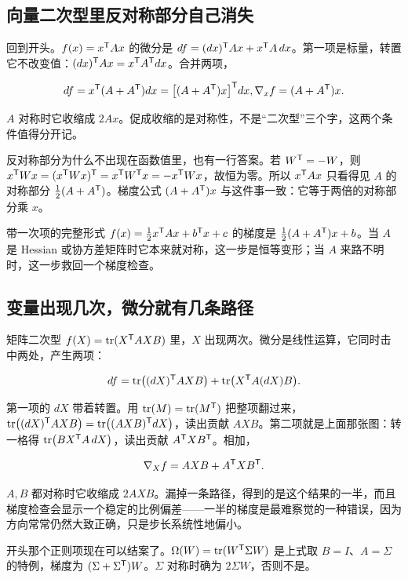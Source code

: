 \subsection{向量二次型里反对称部分自己消失}

回到开头。\(f(x)=x^{\mathsf{T}}Ax\) 的微分是 \(df=(dx)^{\mathsf{T}}Ax+x^{\mathsf{T}}A\,dx\)。第一项是标量，转置它不改变值：\((dx)^{\mathsf{T}}Ax=x^{\mathsf{T}}A^{\mathsf{T}}dx\)。合并两项，

\[
df=x^{\mathsf{T}}(A+A^{\mathsf{T}})dx
=\bigl[(A+A^{\mathsf{T}})x\bigr]^{\mathsf{T}}dx,
\space
\nabla_x f=(A+A^{\mathsf{T}})x.
\]

\(A\) 对称时它收缩成 \(2Ax\)。促成收缩的是对称性，不是``二次型''三个字，这两个条件值得分开记。

反对称部分为什么不出现在函数值里，也有一行答案。若 \(W^{\mathsf{T}}=-W\)，则 \(x^{\mathsf{T}}Wx=(x^{\mathsf{T}}Wx)^{\mathsf{T}}=x^{\mathsf{T}}W^{\mathsf{T}}x=-x^{\mathsf{T}}Wx\)，故恒为零。所以 \(x^{\mathsf{T}}Ax\) 只看得见 \(A\) 的对称部分 \(\tfrac12(A+A^{\mathsf{T}})\)。梯度公式 \((A+A^{\mathsf{T}})x\) 与这件事一致：它等于两倍的对称部分乘 \(x\)。

带一次项的完整形式 \(f(x)=\tfrac12x^{\mathsf{T}}Ax+b^{\mathsf{T}}x+c\) 的梯度是 \(\tfrac12(A+A^{\mathsf{T}})x+b\)。当 \(A\) 是 Hessian 或协方差矩阵时它本来就对称，这一步是恒等变形；当 \(A\) 来路不明时，这一步救回一个梯度检查。

\subsection{变量出现几次，微分就有几条路径}

矩阵二次型 \(f(X)=\operatorname{tr}(X^{\mathsf{T}}AXB)\) 里，\(X\) 出现两次。微分是线性运算，它同时击中两处，产生两项：

\[
df=\operatorname{tr}\bigl((dX)^{\mathsf{T}}AXB\bigr)+\operatorname{tr}\bigl(X^{\mathsf{T}}A(dX)B\bigr).
\]

第一项的 \(dX\) 带着转置。用 \(\operatorname{tr}(M)=\operatorname{tr}(M^{\mathsf{T}})\) 把整项翻过来，\(\operatorname{tr}\bigl((dX)^{\mathsf{T}}AXB\bigr)=\operatorname{tr}\bigl((AXB)^{\mathsf{T}}dX\bigr)\)，读出贡献 \(AXB\)。第二项就是上面那张图：转一格得 \(\operatorname{tr}\bigl(BX^{\mathsf{T}}A\,dX\bigr)\)，读出贡献 \(A^{\mathsf{T}}XB^{\mathsf{T}}\)。相加，

\[
\nabla_X f=AXB+A^{\mathsf{T}}XB^{\mathsf{T}}.
\]

\(A,B\) 都对称时它收缩成 \(2AXB\)。漏掉一条路径，得到的是这个结果的一半，而且梯度检查会显示一个稳定的比例偏差——一半的梯度是最难察觉的一种错误，因为方向常常仍然大致正确，只是步长系统性地偏小。

开头那个正则项现在可以结案了。\(\Omega(W)=\operatorname{tr}(W^{\mathsf{T}}\Sigma W)\) 是上式取 \(B=I\)、\(A=\Sigma\) 的特例，梯度为 \((\Sigma+\Sigma^{\mathsf{T}})W\)。\(\Sigma\) 对称时确为 \(2\Sigma W\)，否则不是。

